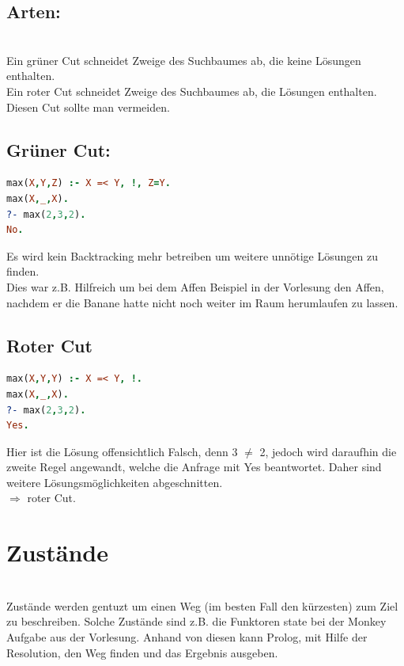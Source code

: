 \subsection{Arten:}\qquad\\
Ein grüner Cut schneidet Zweige des Suchbaumes ab, die keine Lösungen enthalten.\\
Ein roter Cut schneidet Zweige des Suchbaumes ab, die Lösungen enthalten. Diesen Cut sollte man vermeiden.
\subsection{Grüner Cut:}
\begin{lstlisting}[language=Prolog] 
max(X,Y,Z) :- X =< Y, !, Z=Y.
max(X,_,X).
?- max(2,3,2).
No.
\end{lstlisting}
Es wird kein Backtracking mehr betreiben um weitere unnötige Lösungen zu finden. \\
Dies war z.B. Hilfreich um bei dem Affen Beispiel in der Vorlesung den Affen, nachdem er die Banane hatte nicht noch weiter im Raum herumlaufen zu lassen. \\
\newpage
\subsection{Roter Cut}
\begin{lstlisting}[language=Prolog] 
max(X,Y,Y) :- X =< Y, !.
max(X,_,X).
?- max(2,3,2).
Yes.
\end{lstlisting}
Hier ist die Lösung offensichtlich Falsch, denn 3 $\neq$ 2, jedoch wird daraufhin die zweite Regel angewandt, welche die Anfrage mit Yes beantwortet. Daher sind weitere Lösungsmöglichkeiten abgeschnitten.\\
$\Rightarrow$ roter Cut. 

\section{Zustände}\qquad\\
Zustände werden gentuzt um einen Weg (im besten Fall den kürzesten) zum Ziel zu beschreiben. Solche Zustände sind z.B. die Funktoren state bei der Monkey Aufgabe aus der Vorlesung. Anhand von diesen kann Prolog, mit Hilfe der Resolution, den Weg finden und das Ergebnis ausgeben. 